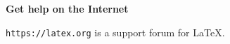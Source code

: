 \documentclass{article}
\begin{document}
\textsf{\textbf{Get help on the Internet}}

\texttt{https://latex.org} is a support forum for \LaTeX.
\end{document}
